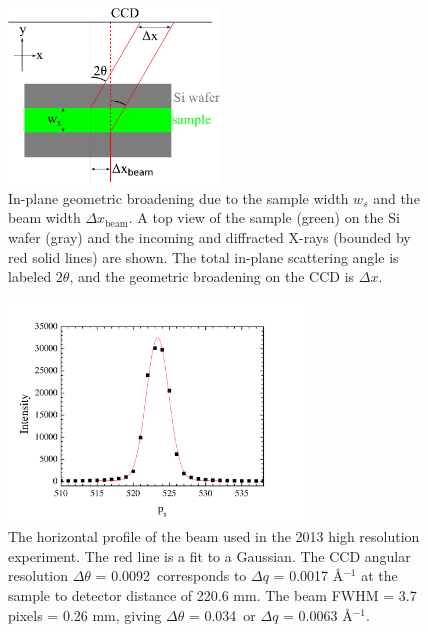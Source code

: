 \begin{figure}[htbp]
  \centering
  \includegraphics[width=0.5\textwidth]{figures/ripple/MMs/waxs/geometric_broadening}
  \caption{In-plane geometric broadening due to the sample width $w_s$ and the beam width $\Delta x_\textrm{beam}$.
  A top view of the sample (green) on the Si wafer (gray) and the
  incoming and diffracted X-rays (bounded by red solid lines)
  are shown. The total in-plane scattering
  angle is labeled $2\theta$, and 
  the geometric broadening on the CCD is $\Delta x$.}
  \label{fig:geometric_broadening}
\end{figure}

\begin{figure}[htbp]
  \centering
  \includegraphics[width=0.7\textwidth]{figures/ripple/MMs/waxs/beamx_hr}
  \caption{The horizontal profile of the beam used in the 2013 high resolution 
  experiment. The red line is a fit to a Gaussian.
  The CCD angular resolution $\Delta\theta$ = 0.0092\textdegree\,
  corresponds to $\Delta q$ = 0.0017 \AA$^{-1}$ at the sample to detector
  distance of 220.6 mm. The beam FWHM = 3.7 pixels = 0.26 mm, giving
  $\Delta\theta$ = 0.034\textdegree\ or $\Delta q$ = 0.0063 \AA$^{-1}$. }
  \label{fig:nGIWAXS_beamx}
\end{figure} 

